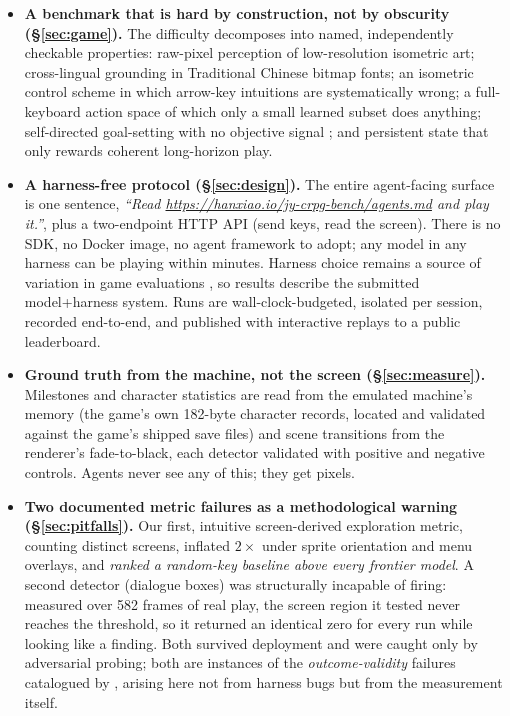 \documentclass{article} %
\begin{document}
\begin{itemize}
\item \textbf{A benchmark that is hard by construction, not by obscurity
(\S\ref{sec:game}).} The difficulty decomposes into named, independently
checkable properties: raw-pixel perception of low-resolution isometric art;
cross-lingual grounding in Traditional Chinese bitmap fonts; an isometric
control scheme in which arrow-key intuitions are systematically wrong; a
full-keyboard action space of which only a small learned subset does
anything; self-directed goal-setting with no objective signal
\citep{arc2026arcagi3}; and persistent state that only rewards coherent
long-horizon play.

\item \textbf{A harness-free protocol (\S\ref{sec:design}).} The entire
agent-facing surface is one sentence, \emph{``Read
\url{https://hanxiao.io/jy-crpg-bench/agents.md} and play it.''}, plus a
two-endpoint HTTP API (send keys, read the screen). There is no SDK, no
Docker image, no agent framework to adopt; any model in any harness can be
playing within minutes. Harness choice remains a source of variation in
game evaluations \citep{hu2026lmgame,phan2025textquests}, so results describe
the submitted model+harness system. Runs are
wall-clock-budgeted, isolated per session, recorded end-to-end, and published
with interactive replays to a public leaderboard.

\item \textbf{Ground truth from the machine, not the screen
(\S\ref{sec:measure}).} Milestones and character statistics are read from
the emulated machine's memory (the game's own 182-byte character records,
located and validated against the game's shipped save files) and scene
transitions from the renderer's fade-to-black, each detector validated with
positive and negative controls. Agents never see any of this; they get
pixels.

\item \textbf{Two documented metric failures as a methodological warning
(\S\ref{sec:pitfalls}).} Our first, intuitive screen-derived exploration
metric, counting distinct screens, inflated $2\times$ under sprite orientation
and menu overlays, and \emph{ranked a random-key baseline above every
frontier model}. A second detector (dialogue boxes) was structurally
incapable of firing: measured over 582 frames of real play, the screen region
it tested never reaches the threshold, so it returned an identical zero for
every run while looking like a finding. Both survived deployment and were
caught only by adversarial probing; both are instances of the
\emph{outcome-validity} failures catalogued by \citet{zhu2025establishing}, arising
here not from harness bugs but from the measurement itself.


\end{itemize}
\end{document}
